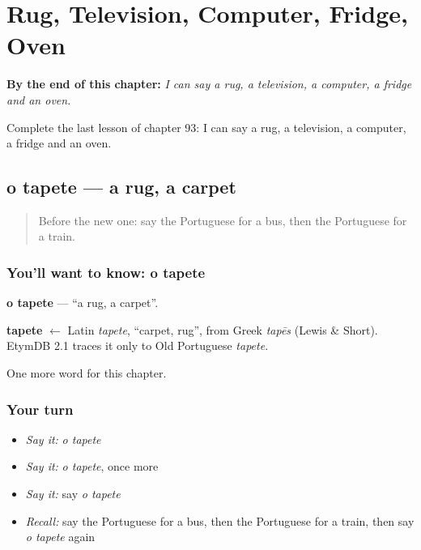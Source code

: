 
\chapter{Rug, Television, Computer, Fridge, Oven}
\label{ch:pt-rug-television-computer-fridge-oven}

\begin{chapteropening}
\textbf{By the end of this chapter:} \emph{I can say a rug, a television, a computer, a fridge and an oven.}

Complete the last lesson of chapter 93: I can say a rug, a television, a computer, a fridge and an oven.
\end{chapteropening}

\section[o tapete]{o tapete — a rug, a carpet}

\label{lesson:PT-C93-tapete}



\begin{quote}
Before the new one: say the Portuguese for a bus, then the Portuguese for a train.
\end{quote}

\subsection*{You'll want to know: o tapete}
\textbf{o tapete} — \textquotedblleft{}a rug, a carpet\textquotedblright{}.

\begin{cousinweb}
\textbf{tapete} $\leftarrow$ Latin \emph{tapete}, \textquotedblleft{}carpet, rug\textquotedblright{}, from Greek \emph{tapēs} (Lewis \& Short). EtymDB 2.1 traces it only to Old Portuguese \emph{tapete}.
\end{cousinweb}

\begin{grammarlens}[title={What you've built}]
One more word for this chapter.
\end{grammarlens}

\subsection*{Your turn}
\begin{itemize}
\raggedright
  \item \emph{Say it:} \emph{o tapete}
  \item \emph{Say it:} \emph{o tapete}, once more
  \item \emph{Say it:} say \emph{o tapete}
  \item \emph{Recall:} say the Portuguese for a bus, then the Portuguese for a train, then say \emph{o tapete} again
\end{itemize}

